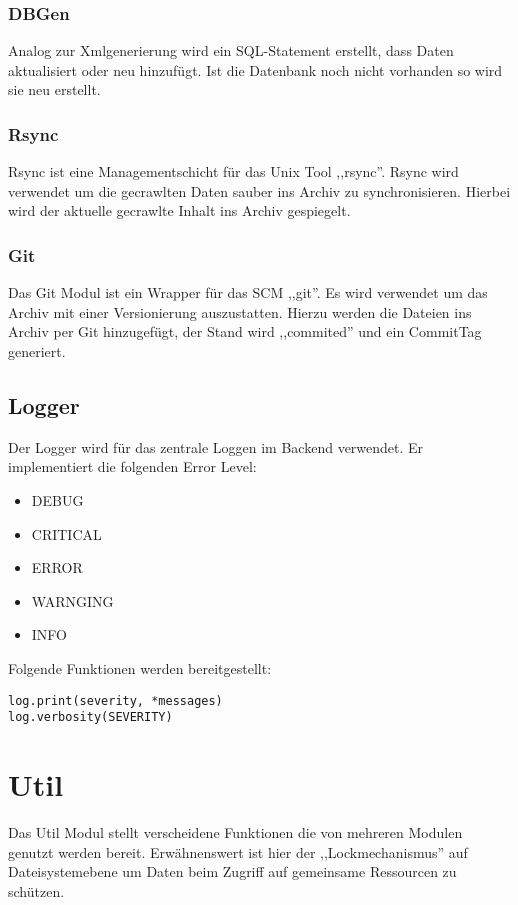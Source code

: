 \subsubsection{DBGen}
\label{ssub:dbgen}
Analog zur Xmlgenerierung wird ein SQL-Statement erstellt, dass Daten aktualisiert oder neu hinzufügt.
Ist die Datenbank noch nicht vorhanden so wird sie neu erstellt.


\subsubsection{Rsync}
\label{ssub:rsync}
Rsync ist eine Managementschicht für das Unix Tool ,,rsync''. Rsync wird verwendet um die gecrawlten Daten sauber ins Archiv zu synchronisieren.
Hierbei wird der aktuelle gecrawlte Inhalt ins Archiv gespiegelt. 


\subsubsection{Git}
\label{ssub:git}
Das Git Modul ist ein Wrapper für das SCM ,,git''. Es wird verwendet um das Archiv mit einer Versionierung auszustatten. Hierzu werden 
die Dateien ins Archiv per Git hinzugefügt, der Stand wird ,,commited'' und ein CommitTag generiert.



\subsection{Logger}
\label{sub:logger}
Der Logger wird für das zentrale Loggen im Backend verwendet. Er implementiert die folgenden Error Level:
\begin{itemize}
    \item DEBUG
    \item CRITICAL
    \item ERROR
    \item WARNGING
    \item INFO
\end{itemize}

Folgende Funktionen werden bereitgestellt:
\begin{verbatim}
log.print(severity, *messages)
log.verbosity(SEVERITY)
\end{verbatim}


\section{Util} 
\label{sec:util}
Das Util Modul stellt verscheidene Funktionen die von mehreren Modulen genutzt werden bereit. Erwähnenswert ist hier der ,,Lockmechanismus''
auf Dateisystemebene um Daten beim Zugriff auf gemeinsame  Ressourcen zu schützen.

